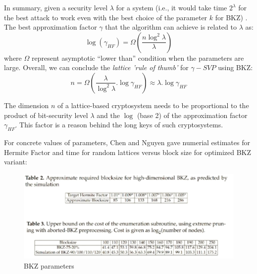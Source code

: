 \begin{description}
            In summary, given a security level $\lambda$ for a system (i.e., it would
            take time $2^\lambda$ for the best attack to work
            even with the best choice of the parameter $k$ for BKZ) .
            The best approximation factor $\gamma$ that the algorithm can
            achieve is related to $\lambda$ as:
            \[
                \log(\gamma_{HF}) = \Omega(\frac{n\log^2\lambda}{\lambda})
            \]
            where $\Omega$ represent asymptotic ``lower than'' condition when
            the parameters are large. Overall, we can conclude the
            \emph{lattice 'rule of thumb'} for $\gamma-SVP$ using BKZ:
            \[
                n = \Omega(\frac{\lambda}{\log^2\lambda}.\log\gamma_{HF})
                \approx \lambda . \log\gamma_{HF}
            \]

            \begin{remark}
                The dimension $n$ of a lattice-based cryptosystem needs to be
                proportional to the product of bit-security level $\lambda$ and
                the $\log$ (base 2) of the approximation factor $\gamma_{HF}$.
                This factor is a reason behind the long keys of such
                cryptosystems.
                \label{rem:dimension}
            \end{remark}

            For concrete values of parameters, Chen and Nguyen \cite{chen2011bkz} gave
            numerial estimates for Hermite Factor and time for random lattices
            versus block size for optimized BKZ variant:

            \begin{figure}[h]
                \centering
                \includegraphics[scale=0.3]{bkzparams}
                \caption{BKZ parameters}
                \label{fig:BKZParams}
            \end{figure}



\end{description}
